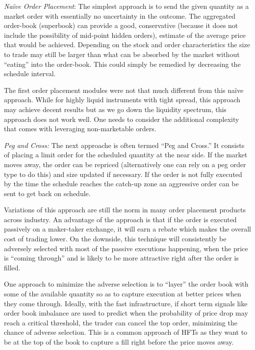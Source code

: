 \noindent\emph{Na\"ive Order Placement}: The simplest approach is to send the given quantity as a market order with essentially no uncertainty in the outcome. The aggregated order-book (superbook) can provide a good, conservative (because it does not include the possibility of mid-point hidden orders), estimate of the average price that would be achieved. Depending on the stock and order characteristics the size to trade may still be larger than what can be absorbed by the market without ``eating'' into the order-book. This could simply be remedied by decreasing the schedule interval.


The first order placement modules were not that much different from this na\"ive approach. While for highly liquid instruments with tight spread, this approach may achieve decent results but as we go down the liquidity spectrum, this approach does not work well. One needs to consider the additional complexity that comes with leveraging non-marketable orders. \twomedskip


\noindent\emph{Peg and Cross:} The next approache is often termed ``Peg and Cross.'' It consists of placing a limit order  for the scheduled quantity at the near side. If the market moves away, the order can be repriced (alternatively one can rely on a peg order type to do this) and size updated if necessary. If the order is not fully executed by the time the schedule reaches the catch-up zone an aggressive order can be sent to get back on schedule.


Variations of this approach are still the norm in many order placement products across industry. An advantage of the approach is that if the order is executed passively on a maker-taker exchange, it will earn a rebate which makes the overall cost of trading lower. On the downside, this technique will consistently be adversely selected with most of the passive executions happening, when the price is ``coming through'' and is likely to be more attractive right after the order is filled.


One approach to minimize the adverse selection is to ``layer'' the order book with some of the available quantity so as to capture execution at better prices when they come through. Ideally, with the fast infrastructure, if short term signals like order book imbalance are used to predict when the probability of price drop may reach a critical threshold, the trader can cancel the top order, minimizing the chance of adverse selection. This is a common approach of HFTs as they want to be at the top of the book to capture a fill right before the price moves away.


